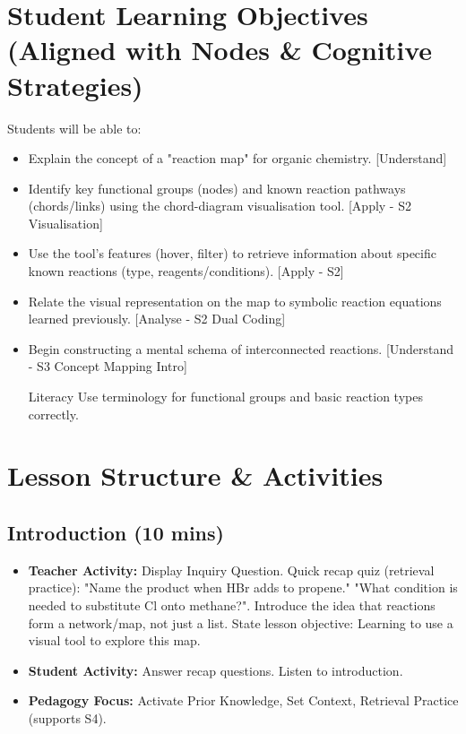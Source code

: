 \documentclass[11pt, a4paper]{article}
\begin{document}
\section*{Student Learning Objectives (Aligned with Nodes \& Cognitive Strategies)}
Students will be able to:
\begin{itemize}
    \item Explain the concept of a "reaction map" for organic chemistry. [Understand]
    \item Identify key functional groups (nodes) and known reaction pathways (chords/links) using the chord-diagram visualisation tool. [Apply - S2 Visualisation]
    \item Use the tool's features (hover, filter) to retrieve information about specific known reactions (type, reagents/conditions). [Apply - S2]
    \item Relate the visual representation on the map to symbolic reaction equations learned previously. [Analyse - S2 Dual Coding]
    \item Begin constructing a mental schema of interconnected reactions. [Understand - S3 Concept Mapping Intro]
    \item [Literacy] Use terminology for functional groups and basic reaction types correctly.
\end{itemize}

\section*{Lesson Structure \& Activities}

\subsection*{Introduction (10 mins)}
\begin{itemize}
    \item \textbf{Teacher Activity:} Display Inquiry Question. Quick recap quiz (retrieval practice): "Name the product when HBr adds to propene." "What condition is needed to substitute Cl onto methane?". Introduce the idea that reactions form a network/map, not just a list. State lesson objective: Learning to use a visual tool to explore this map.
    \item \textbf{Student Activity:} Answer recap questions. Listen to introduction.
    \item \textbf{Pedagogy Focus:} Activate Prior Knowledge, Set Context, Retrieval Practice (supports S4).
\end{itemize}
\end{document}
